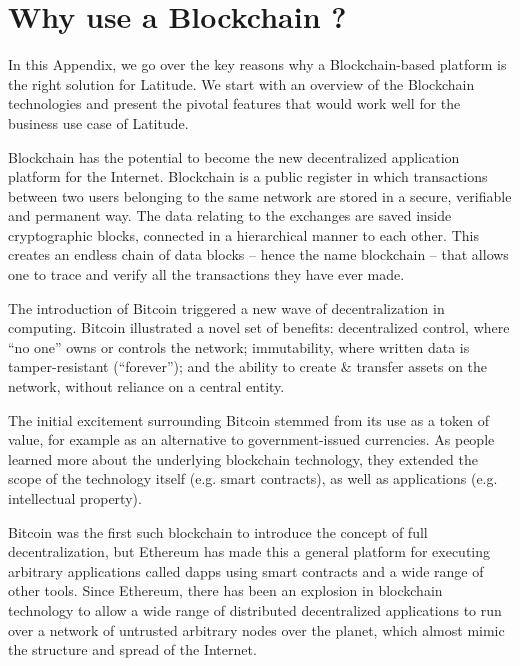 \section{Why use a Blockchain ?}\label{sec:blockchain}

In this Appendix, we go over the key reasons why a Blockchain-based platform is the right solution for Latitude. We
start with an overview of the Blockchain technologies and present the pivotal features that would work well for the
business use case of Latitude.

Blockchain has the potential to become the new decentralized application platform for the Internet. Blockchain is a
public register in which transactions between two users belonging to the same network are stored in a secure, verifiable
and permanent way. The data relating to the exchanges are saved inside cryptographic blocks, connected in a hierarchical
manner to each other. This creates an endless chain of data blocks -- hence the name blockchain -- that allows one to
trace and verify all the transactions they have ever made.

The introduction of Bitcoin \cite{nakamoto2009bitcoin} triggered a new wave of decentralization in computing.
Bitcoin illustrated a novel set of benefits: decentralized control, where ``no one'' owns or controls the network;
immutability, where written data is tamper-resistant (``forever''); and the ability to create \& transfer assets on the
network, without reliance on a central entity.

The initial excitement surrounding Bitcoin stemmed from its use as a token of value, for example as an alternative to
government-issued currencies.  As people learned more about the underlying blockchain technology, they extended the
scope of the technology itself (e.g. smart contracts), as well as applications (e.g. intellectual property).

Bitcoin was the first such blockchain to introduce the concept of full decentralization, but Ethereum has made this a
general platform for executing arbitrary applications called dapps using smart contracts and a wide range of other
tools. Since Ethereum, there has been an explosion in blockchain technology to allow a wide range of distributed
decentralized applications to run over a network of untrusted arbitrary nodes over the planet, which almost mimic the
structure and spread of the Internet.


